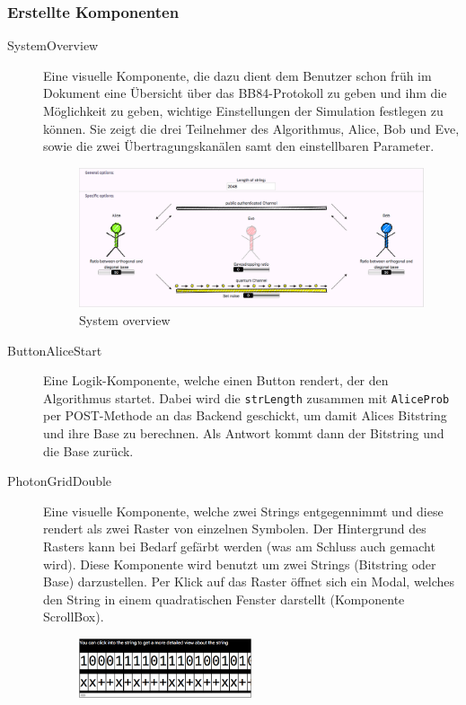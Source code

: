 \documentclass[a4paper,10.2pt,pdftex]{scrartcl}%
\begin{document}
\subsubsection{Erstellte Komponenten} 
\begin{description}
\item[SystemOverview] Eine visuelle Komponente, die dazu dient dem Benutzer schon früh im Dokument eine Übersicht über das BB84-Protokoll zu geben und ihm die Möglichkeit zu geben, wichtige Einstellungen der Simulation festlegen zu können. Sie zeigt die drei Teilnehmer des Algorithmus, Alice, Bob und Eve, sowie die zwei Übertragungskanälen samt den einstellbaren Parameter.
\begin{figure}[h]
	\centering
  \includegraphics[width=\textwidth]{graphics/component_system_overview.png}
	\caption{System overview}
\end{figure}
\item[ButtonAliceStart] Eine Logik-Komponente, welche einen Button rendert, der den Algorithmus startet. Dabei wird die \texttt{strLength} zusammen mit \texttt{AliceProb} per POST-Methode an das Backend geschickt, um damit Alices Bitstring und ihre Base zu berechnen. Als Antwort kommt dann der Bitstring und die Base zurück.
\item[PhotonGridDouble] Eine visuelle Komponente, welche zwei Strings entgegennimmt und diese rendert als zwei Raster von einzelnen Symbolen. Der Hintergrund des Rasters kann bei Bedarf gefärbt werden (was am Schluss auch gemacht wird). Diese Komponente wird benutzt um zwei Strings (Bitstring oder Base) darzustellen. Per Klick auf das Raster öffnet sich ein Modal, welches den String in einem quadratischen Fenster darstellt (Komponente ScrollBox). 
\begin{figure}[h]
	\centering
  \includegraphics[width=0.5\textwidth]{graphics/component_photon_grid_double.png}

\end{figure}
\end{description}
\end{document}
